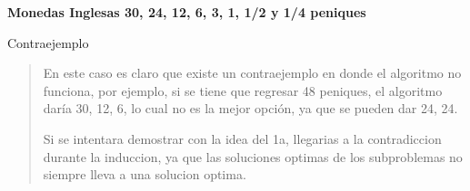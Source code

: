 \textbf{Monedas Inglesas 30, 24, 12, 6, 3, 1, 1/2 y 1/4 peniques}\vspace{.2cm}

\textcolor{bibi}{Contraejemplo}
\begin{quote}
    En este caso es claro que existe un contraejemplo en donde el algoritmo no funciona, por ejemplo, si se tiene que regresar 48 peniques, el algoritmo daría 30, 12, 6, lo cual no es la mejor opción, ya que se pueden dar 24, 24. \vspace{.2cm}

    Si se intentara demostrar con la idea del 1a, llegarias a la contradiccion durante la induccion, ya que las soluciones optimas de los subproblemas no siempre lleva a una solucion optima. \vspace{.2cm}
\end{quote}